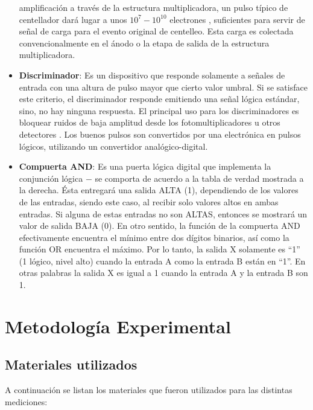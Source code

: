 \documentclass[a4paper,10pt]{article}
\numberwithin{equation}{section}
\begin{document}
\begin{itemize}
 amplificación a través de la estructura multiplicadora, un pulso típico de
 centellador dará lugar a unos $10^7-10^{10}$ electrones \cite{knoll}, suficientes
 para servir de señal de carga para el evento original de centelleo. Esta carga
 es colectada convencionalmente en el ánodo o la etapa de salida de la estructura
 multiplicadora.
 \item \textbf{Discriminador}: Es un dispositivo que responde solamente a señales 
 de entrada con una altura de pulso mayor que cierto valor umbral. Si se satisface 
 este criterio, el discriminador responde emitiendo una señal lógica estándar, sino, 
 no hay ninguna respuesta. El principal uso para los discriminadores es bloquear 
 ruidos de baja amplitud desde los fotomultiplicadores u otros detectores \cite{leo}. Los 
 buenos pulsos son convertidos por una electrónica en pulsos lógicos, utilizando 
 un convertidor analógico-digital.
 \item \textbf{Compuerta AND}: Es una puerta lógica digital que implementa la
 conjunción lógica $-$ se comporta de acuerdo a la tabla de verdad mostrada a la 
 derecha. Ésta entregará una salida ALTA (1), dependiendo de los valores de las 
 entradas, siendo este caso, al recibir solo valores altos en ambas entradas. Si 
 alguna de estas entradas no son ALTAS, entonces se mostrará un valor de salida 
 BAJA (0). En otro sentido, la función de la compuerta AND efectivamente encuentra 
 el mínimo entre dos dígitos binarios, así como la función OR encuentra el máximo.
 Por lo tanto, la salida X solamente es ``1'' (1 lógico, nivel alto) cuando la entrada
 A como la entrada B están en ``1''. En otras palabras la salida X es igual a 1 cuando
 la entrada A y la entrada B son 1.
\end{itemize}

\newpage

\section{Metodología Experimental}
\label{s:metodologiaexperimental}

\subsection{Materiales utilizados}
\label{ss:materialesutilizados}

A continuación se listan los materiales que fueron utilizados para las distintas mediciones:
\end{document}
